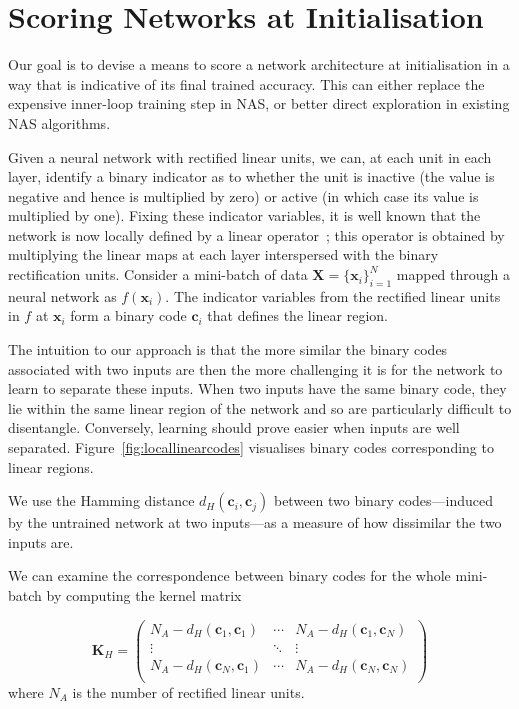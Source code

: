 \documentclass{article}
\newcommand{\cB}{\mathbf{c}}
\newcommand{\xB}{\mathbf{x}}
\newcommand{\XB}{\mathbf{X}}
\newcommand{\matr}[1]{\mathbf{#1}}
\begin{document}
\section{Scoring Networks at Initialisation}
\label{sec:scoring}

Our goal is to devise a means to score a network architecture at initialisation in a way that is indicative of its final trained accuracy. This can either replace the expensive inner-loop training step in NAS, or better direct exploration in existing NAS algorithms.

Given a neural network with rectified linear units, we can, at each unit in each layer, identify a binary indicator as to whether the unit is inactive (the value is negative and hence is multiplied by zero) or active (in which case its value is multiplied by one). Fixing these indicator variables, it is well known that the network is now locally defined by a linear operator~\citep{hanin2019deep}; this operator is obtained by multiplying the linear maps at each layer interspersed with the binary rectification units. Consider a mini-batch of data $\XB = \{\xB_{i}\}_{i=1}^{N}$ mapped through a neural network as $f(\xB_i )$. The indicator variables from the rectified linear units in $f$ at $\xB_i$ form a binary code $\cB_i$ that defines the linear region.

The intuition to our approach is that the more similar the binary codes associated with two inputs are then the more challenging it is for the network to learn to separate these inputs. When two inputs have the same binary code, they lie within the same linear region of the network and so are particularly difficult to disentangle. Conversely, learning should prove easier when inputs are well separated. Figure~\ref{fig:locallinearcodes} visualises binary codes corresponding to linear regions. 

We use the Hamming distance $d_H(\cB_i, \cB_j)$ between two binary codes---induced by the untrained network at two inputs---as a measure of how dissimilar the two inputs are. 


We can examine the correspondence between binary codes for the whole mini-batch by computing the kernel matrix

\begin{equation}
\matr{K}_H = 
\begin{pmatrix}

    N_A {-} d_H(\cB_1, \cB_1) & \cdots & N_A {-} d_H(\cB_1, \cB_N) \\
    \vdots & \ddots & \vdots \\
    N_A {-} d_H(\cB_N, \cB_1) & \cdots & N_A {-} d_H(\cB_N, \cB_N) \\
\end{pmatrix}
\label{eq:KH}
\end{equation}
where $N_A$ is the number of rectified linear units. 
\end{document}
